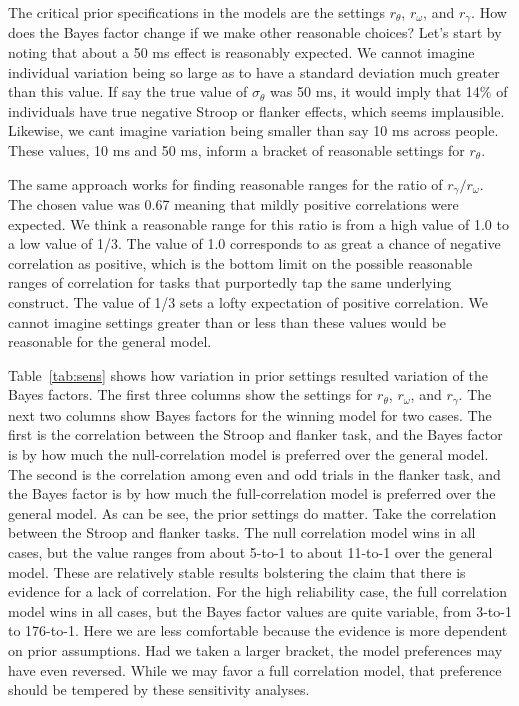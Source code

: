 \documentclass[english,man]{apa6}
\theoremstyle{definition}
\theoremstyle{definition}
\theoremstyle{definition}
\theoremstyle{remark}
\begin{document}
The critical prior specifications in the models are the settings
\(r_\theta\), \(r_\omega\), and \(r_\gamma\). How does the Bayes factor
change if we make other reasonable choices? Let's start by noting that
about a 50 ms effect is reasonably expected. We cannot imagine
individual variation being so large as to have a standard deviation much
greater than this value. If say the true value of \(\sigma_\theta\) was
50 ms, it would imply that 14\% of individuals have true negative Stroop
or flanker effects, which seems implausible. Likewise, we cant imagine
variation being smaller than say 10 ms across people. These values, 10
ms and 50 ms, inform a bracket of reasonable settings for \(r_\theta\).

The same approach works for finding reasonable ranges for the ratio of
\(r_\gamma/r_\omega\). The chosen value was 0.67 meaning that mildly
positive correlations were expected. We think a reasonable range for
this ratio is from a high value of 1.0 to a low value of 1/3. The value
of 1.0 corresponds to as great a chance of negative correlation as
positive, which is the bottom limit on the possible reasonable ranges of
correlation for tasks that purportedly tap the same underlying
construct. The value of 1/3 sets a lofty expectation of positive
correlation. We cannot imagine settings greater than or less than these
values would be reasonable for the general model.

Table~\ref{tab:sens} shows how variation in prior settings resulted
variation of the Bayes factors. The first three columns show the
settings for \(r_\theta\), \(r_\omega\), and \(r_\gamma\). The next two
columns show Bayes factors for the winning model for two cases. The
first is the correlation between the Stroop and flanker task, and the
Bayes factor is by how much the null-correlation model is preferred over
the general model. The second is the correlation among even and odd
trials in the flanker task, and the Bayes factor is by how much the
full-correlation model is preferred over the general model. As can be
see, the prior settings do matter. Take the correlation between the
Stroop and flanker tasks. The null correlation model wins in all cases,
but the value ranges from about 5-to-1 to about 11-to-1 over the general
model. These are relatively stable results bolstering the claim that
there is evidence for a lack of correlation. For the high reliability
case, the full correlation model wins in all cases, but the Bayes factor
values are quite variable, from 3-to-1 to 176-to-1. Here we are less
comfortable because the evidence is more dependent on prior assumptions.
Had we taken a larger bracket, the model preferences may have even
reversed. While we may favor a full correlation model, that preference
should be tempered by these sensitivity analyses.
\end{document}
